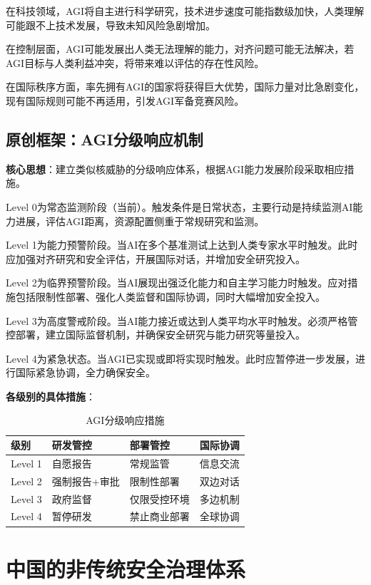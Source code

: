 在科技领域，AGI将自主进行科学研究，技术进步速度可能指数级加快，人类理解可能跟不上技术发展，导致未知风险急剧增加。

在控制层面，AGI可能发展出人类无法理解的能力，对齐问题可能无法解决，若AGI目标与人类利益冲突，将带来难以评估的存在性风险。

在国际秩序方面，率先拥有AGI的国家将获得巨大优势，国际力量对比急剧变化，现有国际规则可能不再适用，引发AGI军备竞赛风险。

\subsection{原创框架：AGI分级响应机制}

\textbf{核心思想}：建立类似核威胁的分级响应体系，根据AGI能力发展阶段采取相应措施。

Level 0为常态监测阶段（当前）。触发条件是日常状态，主要行动是持续监测AI能力进展，评估AGI距离，资源配置侧重于常规研究和监测。

Level 1为能力预警阶段。当AI在多个基准测试上达到人类专家水平时触发。此时应加强对齐研究和安全评估，开展国际对话，并增加安全研究投入。

Level 2为临界预警阶段。当AI展现出强泛化能力和自主学习能力时触发。应对措施包括限制性部署、强化人类监督和国际协调，同时大幅增加安全投入。

Level 3为高度警戒阶段。当AI能力接近或达到人类平均水平时触发。必须严格管控部署，建立国际监督机制，并确保安全研究与能力研究等量投入。

Level 4为紧急状态。当AGI已实现或即将实现时触发。此时应暂停进一步发展，进行国际紧急协调，全力确保安全。

\textbf{各级别的具体措施}：

\begin{table}[H]
\centering
\caption{AGI分级响应措施}
\small
\begin{tabular}{p{1.5cm}p{3cm}p{3.5cm}p{4cm}}
\toprule
\textbf{级别} & \textbf{研发管控} & \textbf{部署管控} & \textbf{国际协调} \\
\midrule
Level 1 & 自愿报告 & 常规监管 & 信息交流 \\
Level 2 & 强制报告+审批 & 限制性部署 & 双边对话 \\
Level 3 & 政府监督 & 仅限受控环境 & 多边机制 \\
Level 4 & 暂停研发 & 禁止商业部署 & 全球协调 \\
\bottomrule
\end{tabular}
\end{table}

\section{中国的非传统安全治理体系}

